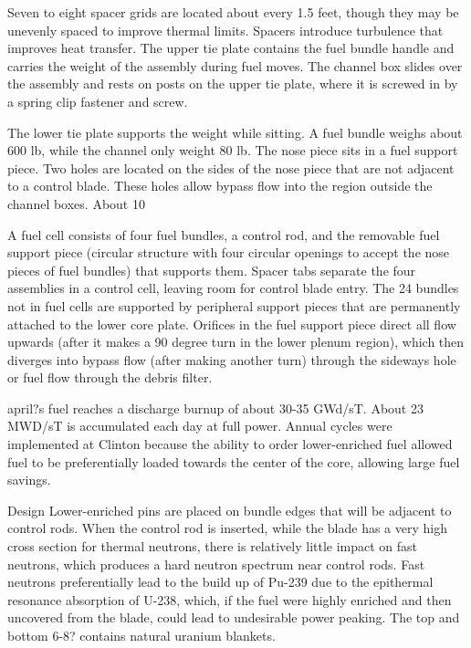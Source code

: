\documentclass[10pt]{article}
\begin{document}
Seven to eight spacer grids are located about every 1.5 feet, though they may be unevenly spaced to improve thermal limits. Spacers introduce turbulence that improves heat transfer. The upper tie plate contains the fuel bundle handle and carries the weight of the assembly during fuel moves. The channel box slides over the assembly and rests on posts on the upper tie plate, where it is screwed in by a spring clip fastener and screw. 

The lower tie plate supports the weight while sitting. A fuel bundle weighs about 600 lb, while the channel only weight 80 lb. The nose piece sits in a fuel support piece. Two holes are located on the sides of the nose piece that are not adjacent to a control blade. These holes allow bypass flow into the region outside the channel boxes. About 10%

A fuel cell consists of four fuel bundles, a control rod, and the removable fuel support piece (circular structure with four circular openings to accept the nose pieces of fuel bundles) that supports them. Spacer tabs separate the four assemblies in a control cell, leaving room for control blade entry. The 24 bundles not in fuel cells are supported by peripheral support pieces that are permanently attached to the lower core plate. Orifices in the fuel support piece direct all flow upwards (after it makes a 90 degree turn in the lower plenum region), which then diverges into bypass flow (after making another turn) through the sideways hole or fuel flow through the debris filter. 

april?s fuel reaches a discharge burnup of about 30-35 GWd/sT. About 23 MWD/sT is accumulated each day at full power. Annual cycles were implemented at Clinton because the ability to order lower-enriched fuel allowed fuel to be preferentially loaded towards the center of the core, allowing large fuel savings.

Design
Lower-enriched pins are placed on bundle edges that will be adjacent to control rods. When the control rod is inserted, while the blade has a very high cross section for thermal neutrons, there is relatively little impact on fast neutrons, which produces a hard neutron spectrum near control rods. Fast neutrons preferentially lead to the build up of Pu-239 due to the epithermal resonance absorption of U-238, which, if the fuel were highly enriched and then uncovered from the blade, could lead to undesirable power peaking. The top and bottom 6-8? contains natural uranium blankets. 
\end{document}

